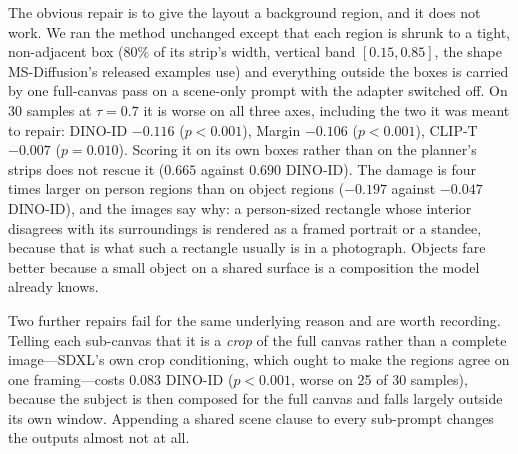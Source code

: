 \documentclass[10pt,twocolumn,letterpaper]{article}
\begin{document}
The obvious repair is to give the layout a background region, and it does not
work.  We ran the method unchanged except that each region is shrunk to a
tight, non-adjacent box ($80\%$ of its strip's width, vertical band
$[0.15,0.85]$, the shape MS-Diffusion's released examples use) and everything
outside the boxes is carried by one full-canvas pass on a scene-only prompt
with the adapter switched off.  On 30 samples at $\tau{=}0.7$ it is worse on
all three axes, including the two it was meant to repair: DINO-ID $-0.116$
($p{<}0.001$), Margin $-0.106$ ($p{<}0.001$), CLIP-T $-0.007$ ($p{=}0.010$).
Scoring it on its own boxes rather than on the planner's strips does not
rescue it ($0.665$ against $0.690$ DINO-ID).  The damage is four times larger
on person regions than on object regions ($-0.197$ against $-0.047$ DINO-ID),
and the images say why: a person-sized rectangle whose interior disagrees with
its surroundings is rendered as a framed portrait or a standee, because that
is what such a rectangle usually is in a photograph.  Objects fare better
because a small object on a shared surface is a composition the model already
knows.

Two further repairs fail for the same underlying reason and are worth
recording.  Telling each sub-canvas that it is a \emph{crop} of the full
canvas rather than a complete image---SDXL's own crop conditioning, which
ought to make the regions agree on one framing---costs $0.083$ DINO-ID
($p{<}0.001$, worse on 25 of 30 samples), because the subject is then composed
for the full canvas and falls largely outside its own window.  Appending a
shared scene clause to every sub-prompt changes the outputs almost not at all.
\end{document}
